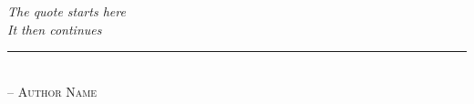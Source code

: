 \chapter*{~}


\begin{center}                      %
\vspace*{2.5in}                     %
    \begin{onehalfspacing}
    \textit{
    The quote starts here \\
    It then continues
    } \\
    
    \rule{1.5in}{0.5pt} \\          %
    
    \textsc{-- Author Name}
\end{onehalfspacing}
\end{center}